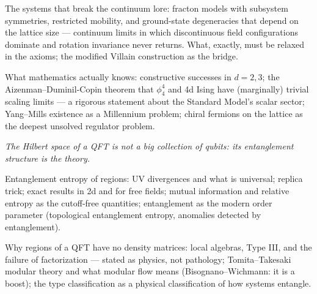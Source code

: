 The systems that break the continuum lore: fracton models with subsystem symmetries, restricted mobility, and ground-state degeneracies that depend on the lattice size --- continuum limits in which discontinuous field configurations dominate and rotation invariance never returns. What, exactly, must be relaxed in the axioms; the modified Villain construction as the bridge.

What mathematics actually knows: constructive successes in $d=2,3$; the Aizenman--Duminil-Copin theorem that $\phi^4_4$ and 4d Ising have (marginally) trivial scaling limits --- a rigorous statement about the Standard Model's scalar sector; Yang--Mills existence as a Millennium problem; chiral fermions on the lattice as the deepest unsolved regulator problem.


\noin \emph{The Hilbert space of a QFT is not a big collection of qubits: its entanglement structure is the theory.}

Entanglement entropy of regions: UV divergences and what is universal; replica trick; exact results in 2d and for free fields; mutual information and relative entropy as the cutoff-free quantities; entanglement as the modern order parameter (topological entanglement entropy, anomalies detected by entanglement).

Why regions of a QFT have no density matrices: local algebras, Type III, and the failure of factorization --- stated as physics, not pathology; Tomita--Takesaki modular theory and what modular flow means (Bisognano--Wichmann: it is a boost); the type classification as a physical classification of how systems entangle.

